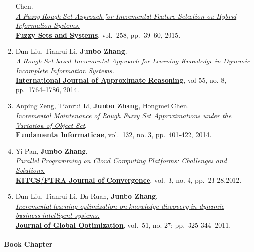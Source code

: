 \documentclass[10pt,a4paper]{article}
\begin{document}
\begin{enumerate}
  Chen.\\ \href{http://dx.doi.org/10.1016/j.fss.2014.08.014}{\emph{A
  Fuzzy Rough Set Approach for Incremental Feature Selection on Hybrid
  Information Systems.}}\\
  \href{http://www.journals.elsevier.com/fuzzy-sets-and-systems}{\textbf{Fuzzy
  Sets and Systems}}, vol.~258, pp.~39--60, 2015.
\item
  Dun Liu, Tianrui Li, \textbf{Junbo Zhang}.\\
  \href{http://dx.doi.org/10.1016/j.ijar.2014.05.009}{\emph{A Rough
  Set-based Incremental Approach for Learning Knowledge in Dynamic
  Incomplete Information Systems.}}\\
  \href{http://www.journals.elsevier.com/international-journal-of-approximate-reasoning}{\textbf{International
  Journal of Approximate Reasoning}}, vol 55, no. 8, pp.~1764--1786,
  2014.
\item
  Anping Zeng, Tianrui Li, \textbf{Junbo Zhang}, Hongmei Chen.\\
  \href{http://dx.doi.org/10.3233/FI-2014-1051}{\emph{Incremental
  Maintenance of Rough Fuzzy Set Approximations under the Variation of
  Object Set}}.\\
  \href{http://www.iospress.nl/journal/fundamenta-informaticae}{\textbf{Fundamenta
  Informaticae}}, vol.~132, no. 3, pp.~401-422, 2014.
\item
  Yi Pan, \textbf{Junbo Zhang}.\\
  \href{http://www.ftrai.org/xe/index.php?mid=joc_published\&category=37964\&search_keyword=section\&search_target=title\&document_srl=38459}{\emph{Parallel
  Programming on Cloud Computing Platforms: Challenges and
  Solutions.}}\\ \href{http://www.ftrai.org/joc/}{\textbf{KITCS/FTRA
  Journal of Convergence}}, vol.~3, no. 4, pp.~23-28,2012.
\item
  Dun Liu, Tianrui Li, Da Ruan, \textbf{Junbo Zhang}.\\
  \href{http://dx.doi.org/10.1007/s10898-010-9607-8}{\emph{Incremental
  learning optimization on knowledge discovery in dynamic business
  intelligent systems.}}\\
  \href{http://www.springer.com/business+\%26+management/operations+research/journal/10898}{\textbf{Journal
  of Global Optimization}}, vol.~51, no. 27: pp.~325-344, 2011.
\end{enumerate}

\paragraph{Book Chapter}\label{book-chapter}
\end{document}
